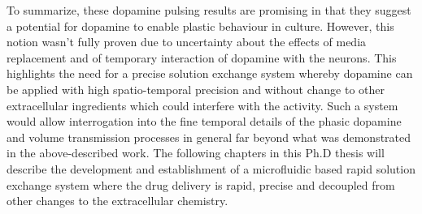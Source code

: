     To summarize, these dopamine pulsing results are promising in that they suggest a potential for dopamine to enable plastic behaviour in culture. However, this notion wasn't fully proven due to uncertainty about the effects of media replacement and of temporary interaction of dopamine with the neurons. This highlights the need for a precise solution exchange system whereby dopamine can be applied with high spatio-temporal precision and without change to other extracellular ingredients which could interfere with the activity. Such a system would allow interrogation into the fine temporal details of the phasic dopamine and volume transmission processes in general far beyond what was demonstrated in the above-described work. The following chapters in this Ph.D thesis will describe the development and establishment of a microfluidic based rapid solution exchange system where the drug delivery is rapid, precise and decoupled from other changes to the extracellular chemistry.
